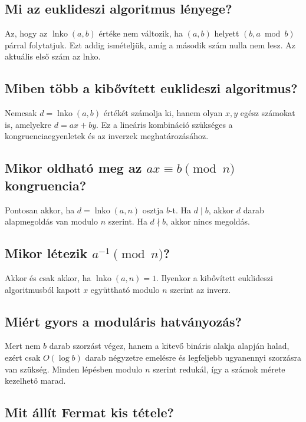 \subsection{Mi az euklideszi algoritmus lényege?}

Az, hogy az $\operatorname{lnko}(a,b)$ értéke nem változik, ha $(a,b)$ helyett $(b,a\bmod b)$ párral folytatjuk. Ezt addig ismételjük, amíg a második szám nulla nem lesz. Az aktuális első szám az lnko.

\subsection{Miben több a kibővített euklideszi algoritmus?}

Nemcsak $d=\operatorname{lnko}(a,b)$ értékét számolja ki, hanem olyan $x,y$ egész számokat is, amelyekre $d=ax+by$. Ez a lineáris kombináció szükséges a kongruenciaegyenletek és az inverzek meghatározásához.

\subsection{Mikor oldható meg az $ax\equiv b\pmod n$ kongruencia?}

Pontosan akkor, ha $d=\operatorname{lnko}(a,n)$ osztja $b$-t. Ha $d\mid b$, akkor $d$ darab alapmegoldás van modulo $n$ szerint. Ha $d\nmid b$, akkor nincs megoldás.

\subsection{Mikor létezik $a^{-1}\pmod n$?}

Akkor és csak akkor, ha $\operatorname{lnko}(a,n)=1$. Ilyenkor a kibővített euklideszi algoritmusból kapott $x$ együttható modulo $n$ szerint az inverz.

\subsection{Miért gyors a moduláris hatványozás?}

Mert nem $b$ darab szorzást végez, hanem a kitevő bináris alakja alapján halad, ezért csak $O(\log b)$ darab négyzetre emelésre és legfeljebb ugyanennyi szorzásra van szükség. Minden lépésben modulo $n$ szerint redukál, így a számok mérete kezelhető marad.

\subsection{Mit állít Fermat kis tétele?}

